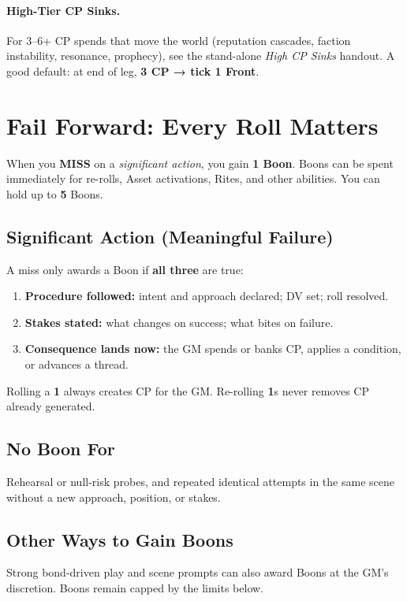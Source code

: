 \paragraph{High-Tier CP Sinks.}
For 3–6+ CP spends that move the world (reputation cascades, faction instability, resonance, prophecy), see the stand-alone \emph{High CP Sinks} handout. A good default: at end of leg, \textbf{3 CP → tick 1 Front}.

\section{Fail Forward: Every Roll Matters}

When you \textbf{MISS} on a \emph{significant action}, you gain \textbf{1 Boon}. Boons can be spent immediately for re-rolls, Asset activations, Rites, and other abilities. You can hold up to \textbf{5} Boons.

\subsection{Significant Action (Meaningful Failure)}
A miss only awards a Boon if \textbf{all three} are true:
\begin{enumerate}
  \item \textbf{Procedure followed:} intent and approach declared; DV set; roll resolved.
  \item \textbf{Stakes stated:} what changes on success; what bites on failure.
  \item \textbf{Consequence lands now:} the GM spends or banks CP, applies a condition, or advances a thread.
\end{enumerate}
\noindent Rolling a \textbf{1} always creates CP for the GM. Re-rolling \textbf{1}s never removes CP already generated.

\subsection{No Boon For}
Rehearsal or null-risk probes, and repeated identical attempts in the same scene without a new approach, position, or stakes.

\subsection{Other Ways to Gain Boons}
Strong bond-driven play and scene prompts can also award Boons at the GM's discretion. Boons remain capped by the limits below.

